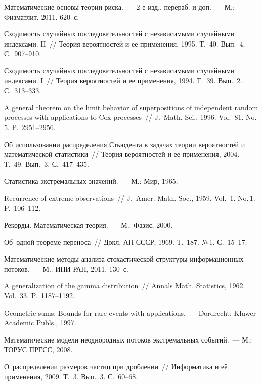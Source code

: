 \begin{multicols}{2}
{{\begin{thebibliography}{99}
Математические основы теории риска.~--- 2-е изд.,
перераб. и доп.~--- М.: Физматлит, 2011. 620~с.

 Сходимость случайных последовательностей с независимыми
случайными индексами. II~// Теория вероятностей и ее применения,
1995. Т.~40. Вып.~4. С.~907--910.

 Сходимость случайных
последовательностей с независимыми случайными индексами. I~// Теория
вероятностей и ее применения, 1994. Т.~39. Вып.~2. С.~313--333.

 A general
theorem on the limit behavior of superpositions of independent
random processes with applications to Cox processes~// 
J.~Math. Sci., 1996. Vol.~81. No.\,5. P.~2951--2956.

 Об использовании распределения Стьюдента в
задачах теории вероятностей и математической статистики~// Теория
вероятностей и ее применения, 2004. Т.~49. Вып.~3. С.~417--435.

 Статистика экстремальных
значений.~--- М.: Мир, 1965.

 Recurrence of extreme observations~//
J.~Amer. Math. Soc., 1959. Vol.~1. No.\,1. P.~106--112.

 Рекорды. Математическая теория.~--- М.: Фазис, 2000.

 Об~одной
теореме переноса~// Докл. АН СССР, 1969. Т.~187. №\,1. С.~15--17.

Математические методы анализа стохастической структуры
информационных потоков.~--- М.: ИПИ РАН, 2011. 130~с.

 A generalization of the gamma
distribution~// Annals Math. Statistics, 1962. Vol.~33. P.~1187--1192.

 Geometric sums: Bounds for rare events with
applications.~--- Dordrecht: Kluwer Academic Publs., 1997.

 Математические модели
неоднородных потоков экстремальных событий.~--- М.: ТОРУС ПРЕСС, 2008.

\label{end\stat}

 О~распределении размеров частиц при
дроблении~// Информатика и её применения, 2009. Т.~3. Вып.~3. С.~60--68.

 \end{thebibliography}
}
}


\end{multicols}       